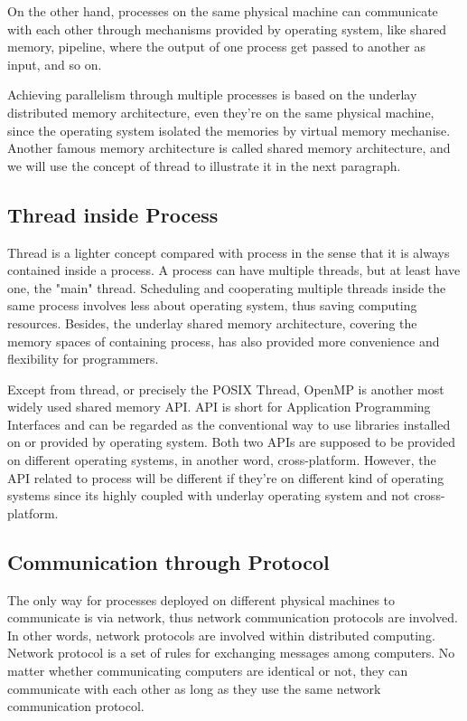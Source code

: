 \documentclass[12pt,a4paper]{report}
\begin{document}
On the other hand, processes on the same physical machine can communicate with each other through mechanisms provided by operating system, like shared memory, pipeline, where the output of one process get passed to another as input, and so on.

Achieving parallelism through multiple processes is based on the underlay distributed memory architecture, even they're on the same physical machine, since the operating system isolated the memories by virtual memory mechanise. Another famous memory architecture is called shared memory architecture, and we will use the concept of thread to illustrate it in the next paragraph.

\subsection{Thread inside Process}

Thread is a lighter concept compared with process in the sense that it is always contained inside a process. A process can have multiple threads, but at least have one, the "main" thread. Scheduling and cooperating multiple threads inside the same process involves less about operating system, thus saving computing resources. Besides, the underlay shared memory architecture, covering the memory spaces of containing process, has also provided more convenience and flexibility for programmers.

Except from thread, or precisely the POSIX Thread, OpenMP is another most widely used shared memory API. API is short for Application Programming Interfaces and can be regarded as the conventional way to use libraries installed on or provided by operating system. Both two APIs are supposed to be provided on different operating systems, in another word, cross-platform. However, the API related to process will be different if they're on different kind of operating systems since its highly coupled with underlay operating system and not cross-platform.

\subsection{Communication through Protocol}

The only way for processes deployed on different physical machines to communicate is via network, thus network communication protocols are involved. In other words, network protocols are involved within distributed computing. Network protocol is a set of rules for exchanging messages among computers. No matter whether communicating computers are identical or not, they can communicate with each other as long as they use the same network communication protocol.
\end{document}
